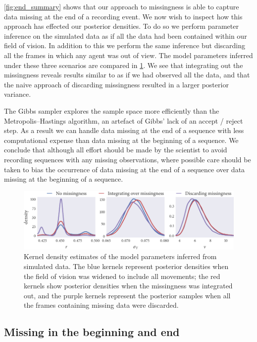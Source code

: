 \cref{fig:end_summary} shows that our approach to missingness is able to
capture data missing at the end of a recording event. We now wish to inspect
how this approach has effected our posterior densities. To do so we perform
parameter inference on the simulated data as if all the data had been contained
within our field of vision. In addition to this we perform the same inference
but discarding all the frames in which any agent was out of view. The model
parameters inferred under these three scenarios are compared in
\cref{fig:end_compare}. We see that integrating out the missingness reveals
results similar to as if we had observed all the data, and that the naive
approach of discarding missingness resulted in a larger posterior variance.

The Gibbs sampler explores the sample space more efficiently than the
Metropolis--Hastings algorithm, an artefact of Gibbs' lack of an accept / reject
step. As a result we can handle data missing at the end of a sequence with
less computational expense than data missing at the beginning of a sequence.
We conclude that although all effort should be made by the scientist to avoid
recording sequences with any missing observations, where possible care should
be taken to bias the occurrence of data missing at the end of a sequence over
data missing at the beginning of a sequence.

\begin{figure}
  \includegraphics{end/compare_params.pdf}
  \caption{Kernel density estimates of the model parameters inferred from
  simulated data. The blue kernels represent posterior densities when the
  field of vision was widened to include all movements; the red kernels
  show posterior densities when the missingness was integrated out, and the
  purple kernels represent the posterior samples when all the frames
  containing missing data were discarded.}
  \label{fig:end_compare}
\end{figure}

\subsection{Missing in the beginning and end}

